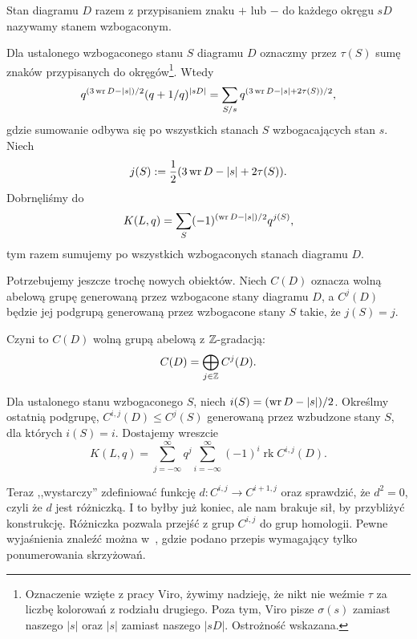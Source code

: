 \begin{definition}
%
    Stan diagramu $D$ razem z przypisaniem znaku $+$ lub $-$ do każdego okręgu $sD$ nazywamy stanem wzbogaconym.
\end{definition}

Dla ustalonego wzbogaconego stanu $S$ diagramu $D$ oznaczmy przez $\tau(S)$ sumę znaków przypisanych do okręgów\footnote{Oznaczenie wzięte z pracy Viro, żywimy nadzieję, że nikt nie weźmie $\tau$ za liczbę kolorowań z rodziału drugiego. Poza tym, Viro pisze $\sigma(s)$ zamiast naszego $|s|$ oraz $|s|$ zamiast naszego $|sD|$. Ostrożność wskazana.}.
Wtedy
\begin{equation}
    q^{(3 \operatorname{wr} D - |s|)/2} (q + 1/q)^{|sD|} = \sum_{S/s} q^{(3 \operatorname{wr} D - |s| + 2 \tau(S))/2},
\end{equation}
gdzie sumowanie odbywa się po wszystkich stanach $S$ wzbogacających stan $s$.
Niech
\begin{equation}
    j(S) := \frac 12 (3 \operatorname{wr} D - |s| + 2 \tau(S)).
\end{equation}
Dobrnęliśmy do
\begin{equation}
    K(L, q) = \sum_S (-1)^{(\operatorname{wr} D - |s|)/2} q^{j(S)},
\end{equation}
tym razem sumujemy po wszystkich wzbogaconych stanach diagramu $D$.

Potrzebujemy jeszcze trochę nowych obiektów.
Niech $C(D)$ oznacza wolną abelową grupę generowaną przez wzbogacone stany diagramu $D$, a $C^j(D)$ będzie jej podgrupą generowaną przez wzbogacone stany $S$ takie, że $j(S) = j$.

Czyni to $C(D)$ wolną grupą abelową z $\mathbb Z$-gradacją:
\begin{equation}
    C(D) = \bigoplus_{j \in \mathbb Z} C^j (D).
\end{equation}

Dla ustalonego stanu wzbogaconego $S$, niech $i(S) = (\operatorname{wr} D - |s|)/2$.
Określmy ostatnią podgrupę, $C^{i,j}(D) \le C^j(S)$ generowaną przez wzbudzone stany $S$, dla których $i(S) = i$.
Dostajemy wreszcie
\begin{equation}
    K(L, q) = \sum_{j = -\infty}^\infty q^j \sum_{i = -\infty}^\infty (-1)^i \operatorname{rk} C^{i, j}(D).
\end{equation}

Teraz ,,wystarczy'' zdefiniować funkcję $d \colon C^{i, j} \to C^{i+1, j}$ oraz sprawdzić, że $d^2 = 0$, czyli że $d$ jest różniczką.
I to byłby już koniec, ale nam brakuje sił, by przybliżyć konstrukcję.
Różniczka pozwala przejść z grup $C^{i,j}$ do grup homologii.
Pewne wyjaśnienia znaleźć można w~\cite[s. 42]{przytycki2015}, gdzie podano przepis wymagający tylko ponumerowania skrzyżowań.
%

